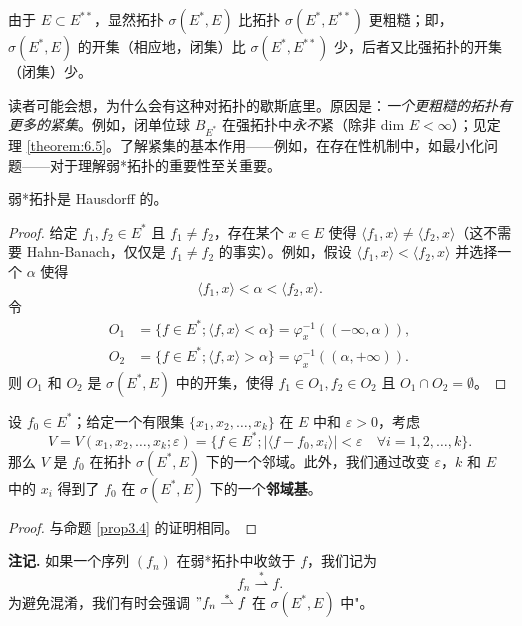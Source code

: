 由于 $E \subset E^{**}$，显然拓扑 $\sigma(E^*, E)$ 比拓扑 $\sigma(E^*, E^{**})$ 更粗糙；即，$\sigma(E^*, E)$ 的开集（相应地，闭集）比 $\sigma(E^*, E^{**})$ 少，后者又比强拓扑的开集（闭集）少。

\begin{remark}\label{remark3.8}
读者可能会想，为什么会有这种对拓扑的歇斯底里。原因是：\textit{一个更粗糙的拓扑有更多的紧集}。例如，闭单位球 $B_{E^*}$ 在强拓扑中\textit{永不}紧（除非 dim $E < \infty$）；见定理 \ref{theorem:6.5}。了解紧集的基本作用——例如，在存在性机制中，如最小化问题——对于理解弱*拓扑的重要性至关重要。
\end{remark}

\begin{proposition}\label{prop3.11}
弱*拓扑是 Hausdorff 的。
\end{proposition}

\begin{proof}
给定 $f_1, f_2 \in E^*$ 且 $f_1 \neq f_2$，存在某个 $x \in E$ 使得 $\langle f_1, x \rangle \neq \langle f_2, x \rangle$（这不需要 Hahn-Banach，仅仅是 $f_1 \neq f_2$ 的事实）。例如，假设 $\langle f_1, x \rangle < \langle f_2, x \rangle$ 并选择一个 $\alpha$ 使得
\[ \langle f_1, x \rangle < \alpha < \langle f_2, x \rangle. \]
令
\begin{align*}
O_1 &= \{ f \in E^*; \langle f, x \rangle < \alpha \} = \varphi_x^{-1}((-\infty, \alpha)), \\
O_2 &= \{ f \in E^*; \langle f, x \rangle > \alpha \} = \varphi_x^{-1}((\alpha, +\infty)).
\end{align*}
则 $O_1$ 和 $O_2$ 是 $\sigma(E^*, E)$ 中的开集，使得 $f_1 \in O_1, f_2 \in O_2$ 且 $O_1 \cap O_2 = \emptyset$。
\end{proof}

\begin{proposition}\label{prop3.12}
设 $f_0 \in E^*$；给定一个有限集 $\{x_1, x_2, \dots, x_k\}$ 在 $E$ 中和 $\varepsilon > 0$，考虑
\[ V = V(x_1, x_2, \dots, x_k; \varepsilon) = \{f \in E^*; |\langle f - f_0, x_i \rangle| < \varepsilon \quad \forall i = 1, 2, \dots, k\}. \]
那么 $V$ 是 $f_0$ 在拓扑 $\sigma(E^*, E)$ 下的一个邻域。此外，我们通过改变 $\varepsilon$，$k$ 和 $E$ 中的 $x_i$ 得到了 $f_0$ 在 $\sigma(E^*, E)$ 下的一个\textbf{邻域基}。
\end{proposition}

\begin{proof}
与命题 \ref{prop3.4} 的证明相同。
\end{proof}

\textbf{注记.} 如果一个序列 $(f_n)$ 在弱*拓扑中收敛于 $f$，我们记为
\[ f_n \stackrel{*}{\rightharpoonup} f. \]
为避免混淆，我们有时会强调 $"f_n \stackrel{*}{\rightharpoonup} f$ 在 $\sigma(E^*, E)$ 中"。

